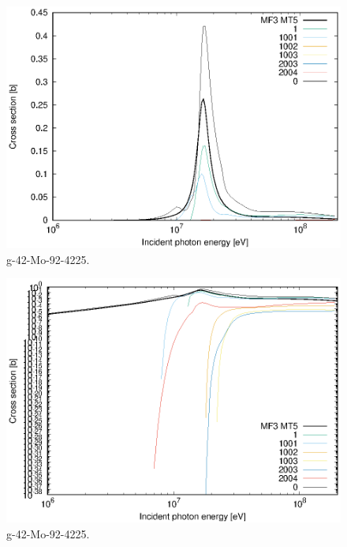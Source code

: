 \begin{figure}
 \includegraphics[width=\linewidth]{eps/g_42-Mo-92_4225.eps}
  \caption{g-42-Mo-92-4225.}
\end{figure}
\begin{figure}
 \includegraphics[width=\linewidth]{eps-log/g_42-Mo-92_4225.eps}
 \caption{g-42-Mo-92-4225.}
\end{figure}
\newpage \clearpage

